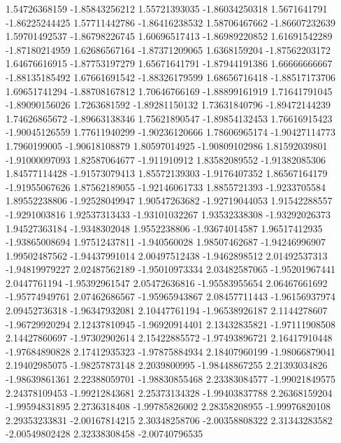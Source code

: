   1.54726368159   -1.85843256212
  1.55721393035   -1.86034250318
   1.5671641791   -1.86225244425
  1.57711442786   -1.86416238532
  1.58706467662   -1.86607232639
  1.59701492537   -1.86798226745
  1.60696517413   -1.86989220852
  1.61691542289   -1.87180214959
  1.62686567164   -1.87371209065
   1.6368159204   -1.87562203172
  1.64676616915   -1.87753197279
  1.65671641791   -1.87944191386
  1.66666666667   -1.88135185492
  1.67661691542   -1.88326179599
  1.68656716418   -1.88517173706
  1.69651741294   -1.88708167812
  1.70646766169   -1.88899161919
  1.71641791045   -1.89090156026
   1.7263681592   -1.89281150132
  1.73631840796   -1.89472144239
  1.74626865672   -1.89663138346
  1.75621890547   -1.89854132453
  1.76616915423   -1.90045126559
  1.77611940299   -1.90236120666
  1.78606965174   -1.90427114773
   1.7960199005   -1.90618108879
  1.80597014925   -1.90809102986
  1.81592039801   -1.91000097093
  1.82587064677     -1.911910912
  1.83582089552   -1.91382085306
  1.84577114428   -1.91573079413
  1.85572139303    -1.9176407352
  1.86567164179   -1.91955067626
  1.87562189055   -1.92146061733
   1.8855721393    -1.9233705584
  1.89552238806   -1.92528049947
  1.90547263682   -1.92719044053
  1.91542288557    -1.9291003816
  1.92537313433   -1.93101032267
  1.93532338308   -1.93292026373
  1.94527363184    -1.9348302048
   1.9552238806   -1.93674014587
  1.96517412935   -1.93865008694
  1.97512437811     -1.940560028
  1.98507462687   -1.94246996907
  1.99502487562   -1.94437991014
  2.00497512438    -1.9462898512
  2.01492537313   -1.94819979227
  2.02487562189   -1.95010973334
  2.03482587065   -1.95201967441
   2.0447761194   -1.95392961547
  2.05472636816   -1.95583955654
  2.06467661692   -1.95774949761
  2.07462686567   -1.95965943867
  2.08457711443   -1.96156937974
  2.09452736318   -1.96347932081
  2.10447761194   -1.96538926187
   2.1144278607   -1.96729920294
  2.12437810945   -1.96920914401
  2.13432835821   -1.97111908508
  2.14427860697   -1.97302902614
  2.15422885572   -1.97493896721
  2.16417910448   -1.97684890828
  2.17412935323   -1.97875884934
  2.18407960199   -1.98066879041
  2.19402985075   -1.98257873148
   2.2039800995   -1.98448867255
  2.21393034826   -1.98639861361
  2.22388059701   -1.98830855468
  2.23383084577   -1.99021849575
  2.24378109453   -1.99212843681
  2.25373134328   -1.99403837788
  2.26368159204   -1.99594831895
   2.2736318408   -1.99785826002
  2.28358208955   -1.99976820108
  2.29353233831   -2.00167814215
  2.30348258706   -2.00358808322
  2.31343283582   -2.00549802428
  2.32338308458   -2.00740796535
